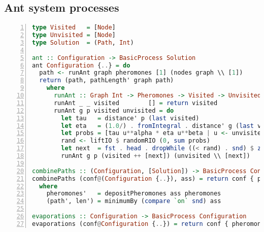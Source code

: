 \begin{landscape}
\section{Ant system processes}
\label{app:ant_system_processes}

\begin{lstlisting}[language=Haskell,frame=tb,numbers=left,caption=Type aliases and the implementation of basic processes for the ant system.]
type Visited   = [Node]
type Unvisited = [Node]
type Solution  = (Path, Int)

ant :: Configuration -> BasicProcess Solution
ant Configuration {..} = do
  path <- runAnt graph pheromones [1] (nodes graph \\ [1])
  return (path, pathLength' graph path)
    where
      runAnt :: Graph Int -> Pheromones -> Visited -> Unvisited -> BasicProcess Path
      runAnt _ _ visited        [] = return visited
      runAnt g p visited unvisited = do
        let tau   = distance' p (last visited)
        let eta   = (1.0/) . fromIntegral . distance' g (last visited)
        let probs = [tau u**alpha * eta u**beta | u <- unvisited]
        rand <- liftIO $ randomRIO (0, sum probs)
        let next  = fst . head . dropWhile ((< rand) . snd) $ zip unvisited (scanl1 (+) probs)
        runAnt g p (visited ++ [next]) (unvisited \\ [next])

combinePaths :: (Configuration, [Solution]) -> BasicProcess Configuration
combinePaths (conf@(Configuration {..}), ass) = return conf { pheromones = pheromones', path = path', pathLen = len' }
  where
    pheromones'   = depositPheromones ass pheromones
    (path', len') = minimumBy (compare `on` snd) ass

evaporations :: Configuration -> BasicProcess Configuration
evaporations (conf@Configuration {..}) = return conf { pheromones = evaporation rho pheromones }
\end{lstlisting}

\end{landscape}